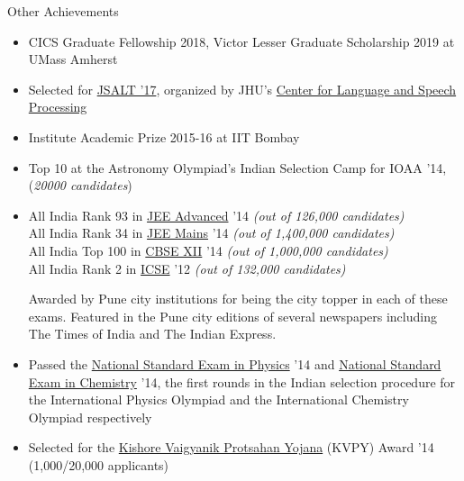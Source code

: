 \documentclass{resume} %
\begin{document}
\vspace{0.1in}

\begin{rSection}{Other Achievements}
\begin{itemize}[leftmargin=*]

\item CICS Graduate Fellowship 2018, Victor Lesser Graduate Scholarship 2019 at UMass Amherst

\item Selected for \href{https://www.lti.cs.cmu.edu/2017-jsalt-undergraduate}{JSALT '17}, organized by JHU's \href{https://www.clsp.jhu.edu/}{Center for Language and Speech Processing}\footnotemark[2] 
\item Institute Academic Prize 2015-16 at IIT Bombay
\item Top 10 at the Astronomy Olympiad's Indian Selection Camp for IOAA '14, (\textit{20000 candidates})
\item All India Rank 93 in \href{https://en.wikipedia.org/wiki/Joint_Entrance_Examination}{JEE Advanced} '14 \textit{(out of 126,000 candidates)} \\ All India Rank 34 in \href{https://en.wikipedia.org/wiki/Joint_Entrance_Examination}{JEE Mains} '14 \textit{(out of 1,400,000 candidates)} \\
All India Top 100 in \href{https://en.wikipedia.org/wiki/Central_Board_of_Secondary_Education}{CBSE XII} '14 \textit{(out of 1,000,000 candidates)} \\
All India Rank 2 in \href{https://en.wikipedia.org/wiki/Indian_Certificate_of_Secondary_Education}{ICSE} '12 \textit{(out of 132,000 candidates)} \vspace{0.01in}

Awarded by Pune city institutions for being the city topper in each of these exams. Featured in the Pune city editions of several newspapers including The Times of India and The Indian Express.
\item Passed the \href{https://www.iapt.org.in/exams/nse/nsep.html}{National Standard Exam in Physics} '14 and \href{https://www.iapt.org.in/exams/nse/nsec-b-a-js.html}{National Standard Exam in Chemistry} '14, the first rounds in the Indian selection procedure for the International Physics Olympiad and the International Chemistry Olympiad respectively
\item Selected for the \href{http://www.kvpy.iisc.ernet.in/main/index.htm}{Kishore Vaigyanik Protsahan Yojana} (KVPY) Award '14 (1,000/20,000 applicants)
\end{itemize}
\end{rSection}
\end{document}
